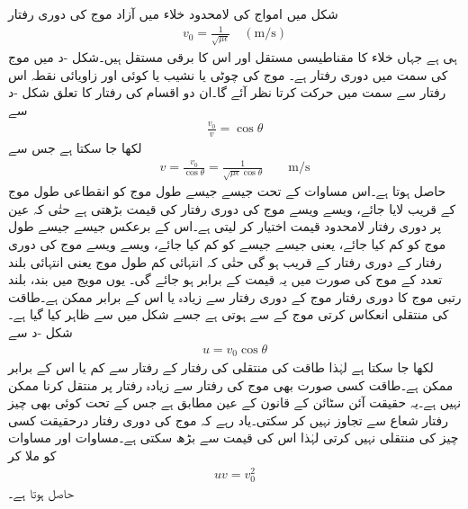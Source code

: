 شکل  میں  امواج کی   لامحدود خلاء میں آزاد موج کی دوری رفتار
\begin{align}
v_0=\frac{1}{\sqrt{\mu \epsilon}} \quad (\si{\meter \per \second})
\end{align}
ہی ہے جہاں خلاء کا مقناطیسی مستقل  اور اس کا برقی مستقل  ہیں۔شکل -د میں  موج کی  سمت میں دوری رفتار  ہے۔ موج کی چوٹی یا نشیب یا کوئی اور زاویائی نقطہ اس رفتار سے  سمت میں حرکت کرتا نظر آئے گا۔ان دو اقسام کی رفتار کا تعلق شکل -د سے
\begin{align}
\frac{v_0}{v}=\cos \theta
\end{align}
لکھا جا سکتا ہے جس سے
\begin{align}\label{مساوات_مویج_دوری_رفتار_تعلق_الف}
v=\frac{v_0}{\cos \theta}=\frac{1}{\sqrt{\mu \epsilon} \cos \theta} \quad \quad \si{\meter\per\second}
\end{align}
حاصل ہوتا ہے۔اس مساوات کے تحت جیسے جیسے طول موج کو انقطاعی طول موج کے قریب لایا جائے، ویسے ویسے  موج کی دوری رفتار کی قیمت بڑھتی ہے حتٰی کہ عین  پر دوری رفتار لامحدود قیمت اختیار کر لیتی ہے۔اس کے برعکس جیسے جیسے طول موج کو کم کیا جائے، یعنی جیسے جیسے  کو کم کیا جائے، ویسے ویسے  موج کی دوری رفتار  کے دوری رفتار کے قریب ہو گی حتٰی کہ انتہائی کم طول موج یعنی انتہائی بلند تعدد کے موج کی صورت میں یہ قیمت  کے برابر ہو جائے گی۔ یوں مویج میں بند، بلند رتبی موج کا دوری رفتار  موج کے دوری رفتار سے زیادہ یا اس کے برابر ممکن ہے۔طاقت کی منتقلی انعکاس کرتی موج کے  سے ہوتی ہے جسے شکل میں  سے ظاہر کیا گیا ہے۔شکل -د سے
\begin{align}\label{مساوات_مویج_دوری_رفتار_تعلق_ب}
u=v_0 \cos \theta
\end{align}
لکھا جا سکتا ہے لہٰذا طاقت کی منتقلی کی رفتار  کے رفتار سے کم یا اس کے برابر ممکن ہے۔طاقت کسی صورت بھی  موج کی رفتار سے زیادہ رفتار پر منتقل کرنا ممکن نہیں ہے۔یہ حقیقت آئن سٹائن کے قانون کے عین مطابق ہے جس کے تحت کوئی بھی چیز رفتار شعاع سے تجاوز نہیں کر سکتی۔یاد رہے کہ  موج کی دوری رفتار درحقیقت کسی چیز کی منتقلی نہیں کرتی لہٰذا اس کی قیمت  سے بڑھ سکتی ہے۔مساوات  اور مساوات   کو ملا کر 
\begin{align}\label{مساوات_مویج_دوری_رفتار_تعلق_پ}
u v =v_0^2
\end{align}
حاصل ہوتا ہے۔


